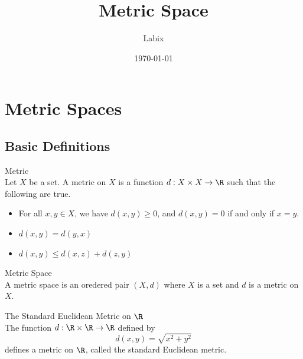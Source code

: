 \documentclass[a4paper]{article}
\title{Metric Space}
\author{Labix}
\date{\today}
\begin{document}
\maketitle

\pagebreak
\tableofcontents
\pagebreak
\section{Metric Spaces}
\subsection{Basic Definitions}
\begin{defn}{Metric}{}\\
Let $X$ be a set. A metric on $X$ is a function $d:X\times X\to\R$ such that the following are true. 
\begin{itemize}
\item For all $x,y\in X$, we have $d(x,y)\geq 0$, and $d(x,y)=0$ if and only if $x=y$. 
\item $d(x,y)=d(y,x)$
\item $d(x,y)\leq d(x,z)+d(z,y)$
\end{itemize}
\end{defn}

\begin{defn}{Metric Space}{}\\
A metric space is an oredered pair $(X,d)$ where $X$ is a set and $d$ is a metric on $X$. 
\end{defn}

\begin{eg}{The Standard Euclidean Metric on $\R$}{}\\
The function $d:\R\times\R\to\R$ defined by $$d(x,y)=\sqrt{x^2+y^2}$$ defines a metric on $\R$, called the standard Euclidean metric. 
\end{eg}
\end{document}
